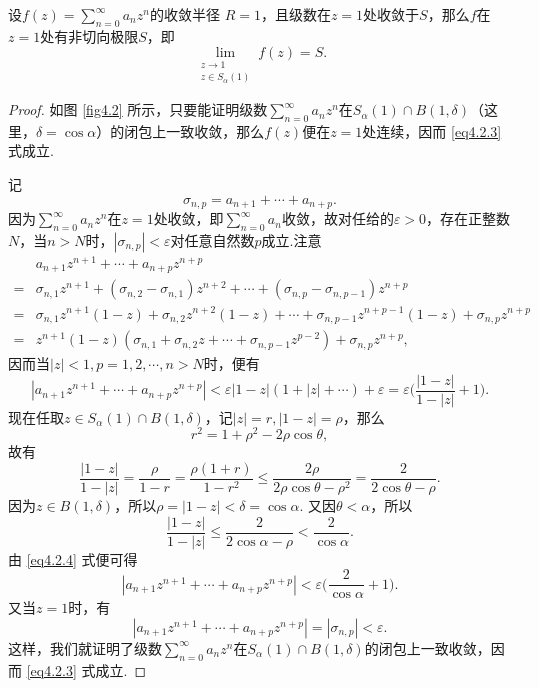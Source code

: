\begin{theorem}\label{thm4.2.9}
设$f(z)=\sum_{n=0}^\infty a_nz^n$的收敛半径
$R=1$，且级数在$z=1$处收敛于$S$，那么$f$在$z=1$处有非切向极限$S$，即
\begin{equation}\label{eq4.2.3}
\lim_{\substack{z\to1\\z\in S_\alpha(1)}}f(z)=S.
\end{equation}
\end{theorem}
\begin{proof}
如图 \ref{fig4.2} 所示，只要能证明级数$\sum_{n=0}^\infty a_nz^n$在$S_\alpha(1)\cap B(1,\delta)$（这里，$\delta=\cos\alpha$）的闭包上一致收敛，那么$f(z)$便在$z=1$处连续，因而 \eqref{eq4.2.3} 式成立.

记
\[\sigma_{n,p}=a_{n+1}+\cdots+a_{n+p}.\]
因为$\sum_{n=0}^\infty a_nz^n$在$z=1$处收敛，即$\sum_{n=0}^\infty a_n$收敛，故对任给的$\varepsilon>0$，存在正整数$N$，当$n>N$时，$|\sigma_{n,p}|<\varepsilon$对任意自然数$p$成立.注意
\begin{align*}
&a_{n+1}z^{n+1}+\cdots+a_{n+p}z^{n+p}\\
={}&\sigma_{n,1}z^{n+1}+
(\sigma_{n,2}-\sigma_{n,1})z^{n+2}+\cdots+(\sigma_{n,p}-\sigma_{n,p-1})z^{n+p}\\
={}&\sigma_{n,1}z^{n+1}(1-z)+\sigma_{n,2}z^{n+2}(1-z)+\cdots+\sigma_{n,p-1}z^{n+p-1}(1-z)
+\sigma_{n,p}z^{n+p}\\
={}&z^{n+1}(1-z)(\sigma_{n,1}
+\sigma_{n,2}z+\cdots+\sigma_{n,p-1}z^{p-2})+\sigma_{n,p}z^{n+p},
\end{align*}
因而当$|z|<1,p=1,2,\cdots,n>N$时，便有
\begin{equation}\label{eq4.2.4}
|a_{n+1}z^{n+1}+\cdots+a_{n+p}z^{n+p}|<\varepsilon|1-z|(1+|z|+\cdots)+\varepsilon
=\varepsilon\bigg(\frac{|1-z|}{1-|z|}+1\bigg).
\end{equation}
现在任取$z\in S_\alpha(1)\cap B(1,\delta)$，记$|z|=r,|1-z|=\rho$，那么
\[r^2=1+\rho^2-2\rho\cos\theta,\]
故有
\[\frac{|1-z|}{1-|z|}=\frac\rho{1-r}=\frac{\rho(1+r)}{1-r^2}\le
\frac{2\rho}{2\rho\cos\theta-\rho^2}=\frac2{2\cos\theta-\rho}.\]
因为$z\in B(1,\delta)$，所以$\rho=|1-z|<\delta=\cos\alpha$. 又因$\theta<\alpha$，所以
\[\frac{|1-z|}{1-|z|}\le\frac2{2\cos\alpha-\rho}<\frac2{\cos\alpha}.\]
由 \eqref{eq4.2.4} 式便可得
\[|a_{n+1}z^{n+1}+\cdots+a_{n+p}z^{n+p}|<\varepsilon\bigg(\frac2{\cos\alpha}+1\bigg).\]
又当$z=1$时，有
\[|a_{n+1}z^{n+1}+\cdots+a_{n+p}z^{n+p}|=|\sigma_{n,p}|<\varepsilon.\]
这样，我们就证明了级数$\sum_{n=0}^\infty a_nz^n$在$S_\alpha(1)\cap B(1,\delta)$的闭包上一致收敛，因而 \eqref{eq4.2.3} 式成立.
\end{proof}

